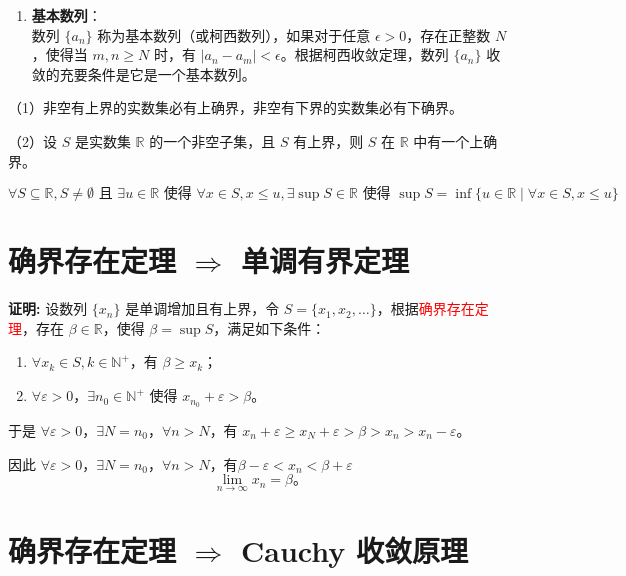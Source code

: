 \documentclass[lang=cn,newtx,10pt,scheme=chinese]{elegantbook}
\begin{document}
\begin{note}
\begin{enumerate}
    \item \textbf{基本数列}：\\
    数列 \( \{a_n\} \) 称为基本数列（或柯西数列），如果对于任意 \( \epsilon > 0 \)，存在正整数 \( N \)，使得当 \( m, n \geq N \) 时，有 \( |a_n - a_m| < \epsilon \)。根据柯西收敛定理，数列 \( \{a_n\} \) 收敛的充要条件是它是一个基本数列。
\end{enumerate}
\end{note}

\begin{theorem} \label{def:int1}
（1）非空有上界的实数集必有上确界，非空有下界的实数集必有下确界。

（2）设 $S$ 是实数集 $\mathbb{R}$ 的一个非空子集，且 $S$ 有上界，则 $S$ 在 $\mathbb{R}$ 中有一个上确界。

\[
\forall S \subseteq \mathbb{R}, S \neq \emptyset \text{ 且 } \exists u \in \mathbb{R} \text{ 使得 } \forall x \in S, x \leq u, \exists \sup S \in \mathbb{R} \text{ 使得 } \sup S = \inf \{u \in \mathbb{R} \mid \forall x \in S, x \leq u\}
\]

\end{theorem}

\section*{确界存在定理 $\Rightarrow$ 单调有界定理   }

\textbf{证明:} 设数列 $\{x_n\}$ 是单调增加且有上界，令 $S = \{x_1, x_2, \ldots\}$，根据\textcolor{red}{确界存在定理}，存在 $\beta \in \mathbb{R}$，使得 $\beta = \sup S$，满足如下条件：
\begin{enumerate}
    \item $\forall x_k \in S, k \in \mathbb{N}^{+}$，有 $\beta \geq x_k$；
    \item $\forall \varepsilon > 0$，$\exists n_0 \in \mathbb{N}^{+}$ 使得 $x_{n_0} + \varepsilon > \beta$。
\end{enumerate}

于是 $\forall \varepsilon > 0$，$\exists N = n_0$，$\forall n > N$，有 $x_n + \varepsilon \geq x_N + \varepsilon > \beta > x_n > x_n - \varepsilon$。

因此 $\forall \varepsilon > 0$，$\exists N = n_0$，$\forall n > N$，有$\beta - \varepsilon<  x_n < \beta + \varepsilon$
\[
\lim_{n \to \infty} x_n = \beta。
\]

\section*{确界存在定理 $\Rightarrow$ Cauchy 收敛原理  }   
\end{document}
